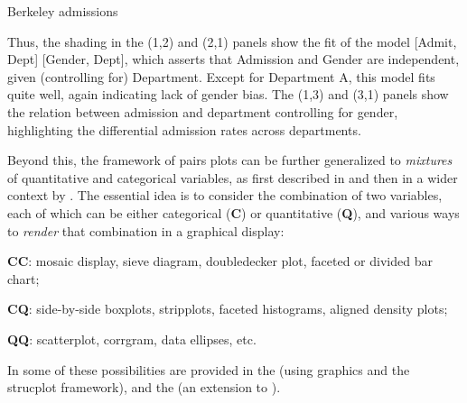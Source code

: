 \documentclass[11pt]{book}\usepackage[]{graphicx}\usepackage[]{color}
\newenvironment{knitrout}{}{} %
\renewenvironment{knitrout}{\small\renewcommand{\baselinestretch}{.85}}{} %
\begin{document}
\begin{Example}[berkeley4b]{Berkeley admissions}
\begin{knitrout}
\end{knitrout}

Thus, the shading in the (1,2) and (2,1) panels show the fit of the model
[Admit, Dept] [Gender, Dept],
which asserts that Admission and Gender are independent, given (controlling
for) Department.  Except for Department A, this model fits quite well,
again indicating lack of gender bias.
The (1,3) and (3,1) panels show the relation between admission and department
controlling for gender, highlighting the differential admission rates
across departments.

\end{Example}

Beyond this, the framework of pairs plots can be further generalized to \emph{mixtures}
of quantitative and categorical variables, as first described in \citet{Friendly:03:apa}
and then in a wider context by \citet{Emerson-etal:2013,Friendly:2013:genpairs}.
The essential idea is to consider the combination of two variables, each of which can
be either categorical (\textbf{C}) or quantitative (\textbf{Q}), and various ways to \emph{render} that
combination in a graphical display:

\begin{description*}
  \item[\textbf{CC}:] mosaic display, sieve diagram, doubledecker plot, faceted or divided bar chart;
  \item[\textbf{CQ}:] side-by-side boxplots, stripplots, faceted histograms, aligned density plots;
  \item[\textbf{QQ}:] scatterplot, corrgram, data ellipses, etc.
\end{description*}
In \R some of these possibilities are provided in the  (using  graphics
and the  strucplot framework), and the 
(an extension to ).
\end{document}
